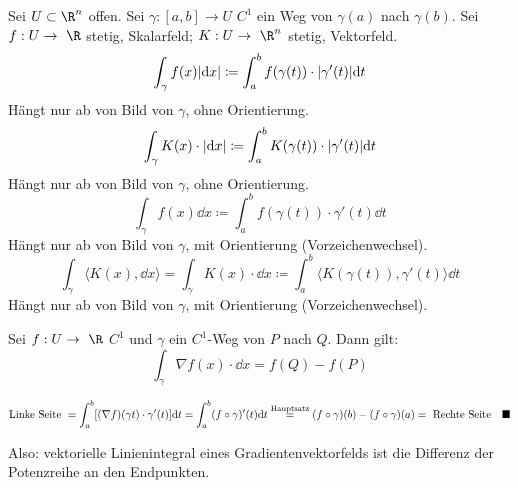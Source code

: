 \begin{def*}[note = Linienintegral , index = Linien integral , indexformat = {1.2 2!1-~}]
	Sei $U \subset \R^n$ offen. Sei $\gamma : [a,b] \rightarrow U$ $C^1$ ein Weg von $\gamma(a)$ nach $\gamma(b)$. Sei $f: U \rightarrow \R$ stetig, Skalarfeld; $K: U \rightarrow \R^n$ stetig, Vektorfeld.
	\[ \int_{\gamma} f(x) \abs{\dd x} \coloneqq \int_a^b f(\gamma(t)) \cdot \abs{\gamma'(t)} \dd t \]
	Hängt nur ab von Bild von $\gamma$, ohne Orientierung.
	\[ \int_{\gamma} K(x) \cdot \abs{\dd x} \coloneqq \int_a^b K(\gamma(t)) \cdot \abs{\gamma'(t)} \dd t \]
	Hängt nur ab von Bild von $\gamma$, ohne Orientierung.
	\[ \int_{\gamma} f(x) \dd x \coloneqq \int_a^b f(\gamma(t)) \cdot \gamma'(t) \dd t \]
	Hängt nur ab von Bild von $\gamma$, mit Orientierung (Vorzeichenwechsel).
	\[ \int_{\gamma} \langle K(x) , \dd x \rangle = \int_{\gamma} K(x) \cdot \dd x \coloneqq \int_a^b \langle K(\gamma(t)) , \gamma'(t) \rangle \dd t \]
	Hängt nur ab von Bild von $\gamma$, mit Orientierung (Vorzeichenwechsel).
\end{def*}
\begin{satz*}
	Sei $f: U \rightarrow \R$ $C^1$ und $\gamma$ ein $C^1$-Weg von $P$ nach $Q$. Dann gilt:
	\[ \int_{\gamma} \nabla f(x) \cdot \dd x = f(Q) - f(P) \]
	\begin{bew}
		\begin{gather*}
			\text{Linke Seite } = \int_a^b [ (\nabla f)(\gamma t) \cdot \gamma'(t) ] \dd t = \int_a^b (f \circ \gamma)'(t) \dd t \overset{\text{\scriptsize{Hauptsatz}}}{=} (f \circ \gamma)(b) - (f \circ \gamma)(a) = \text{ Rechte Seite} \quad \blacksquare
		\end{gather*}
	\end{bew}
	Also: vektorielle Linienintegral eines Gradientenvektorfelds ist die Differenz der Potenzreihe an den Endpunkten.
\end{satz*}
